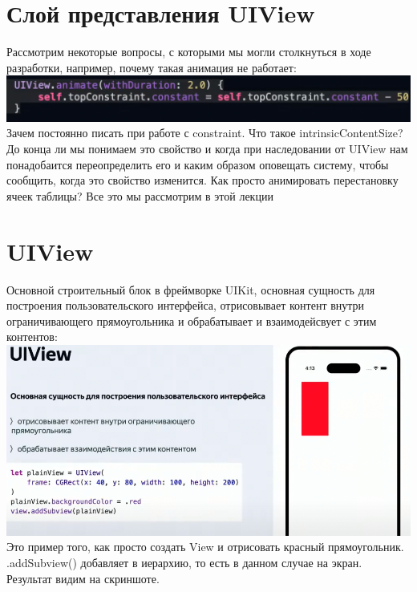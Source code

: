 \documentclass{article}
\begin{document}
    \section{Слой представления UIView}
    Рассмотрим некоторые вопросы, с которыми мы могли столкнуться в ходе разработки, например, почему такая анимация не работает: 
    \newline
    \includegraphics[scale = 0.3]{pic/Снимок экрана 2023-07-31 в 19.58.40.png}
    \newline
    Зачем постоянно писать  при работе с constraint.
    \newline
    Что такое intrinsicContentSize? До конца ли мы понимаем это свойство и когда при наследовании от UIView нам понадобаится переопределить его и каким образом оповещать систему, чтобы сообщить, когда это свойство изменится. 
    \newline
    Как просто анимировать перестановку ячеек таблицы? Все это мы рассмотрим в этой лекции
    \section{UIView}
    Основной строительный блок в фреймворке UIKit, основная сущность для построения пользовательского интерфейса, отрисовывает контент внутри ограничивающего прямоугольника и обрабатывает и взаимодейсвует с этим контентов: 
    \newline
    \includegraphics[scale = 0.3]{pic/Снимок экрана 2023-07-31 в 20.06.27.png}
    \newline
    Это пример того, как просто создать View и отрисовать красный прямоугольник. .addSubview() добавляет в иерархию, то есть в данном случае на экран. Результат видим на скриншоте. 
    \newline
\end{document}
